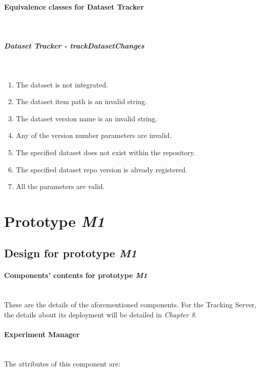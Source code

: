 \paragraph{Equivalence classes for Dataset Tracker} \mbox{}\\

\subparagraph{Dataset Tracker - trackDatasetChanges} \mbox{}\\

\begin{enumerate}
    \item The dataset is not integrated.
    \item The dataset item path is an invalid string.
    \item The dataset version name is an invalid string.
    \item Any of the version number parameters are invalid.
    \item The specified dataset does not exist within the repository.
    \item The specified dataset repo version is already registered.
    \item All the parameters are valid.
\end{enumerate}

\section{Prototype \emph{M1}}

\subsection{Design for prototype \emph{M1}}

\paragraph{Components' contents for prototype \emph{M1}} \mbox{}\\

These are the details of the aforementioned components. For the Tracking Server, the details about its deployment will be detailed in \emph{Chapter 8}.

\paragraph{Experiment Manager}\mbox{}\\

The attributes of this component are:

